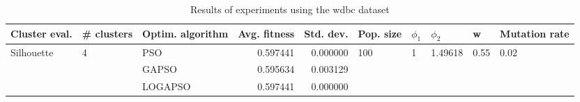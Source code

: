 \begin{table}
\centering
\caption{Results of experiments using the wdbc dataset}
\begin{tabular}{lllrrlllll}
\toprule
              Cluster eval. &        \# clusters & Optim. algorithm &  Avg. fitness &  Std. dev. &            Pop. size &         $\phi_{1}$ &               $\phi_{2}$ &                     w &         Mutation rate \\
\midrule
\multirow{3}{*}{Silhouette} & \multirow{3}{*}{4} &              PSO &      0.597441 &   0.000000 & \multirow{3}{*}{100} & \multirow{3}{*}{1} & \multirow{3}{*}{1.49618} & \multirow{3}{*}{0.55} & \multirow{3}{*}{0.02} \\
                            &                    &            GAPSO &      0.595634 &   0.003129 &                      &                    &                          &                       &                       \\
                            &                    &          LOGAPSO &      0.597441 &   0.000000 &                      &                    &                          &                       &                       \\
\bottomrule
\end{tabular}
\end{table}
